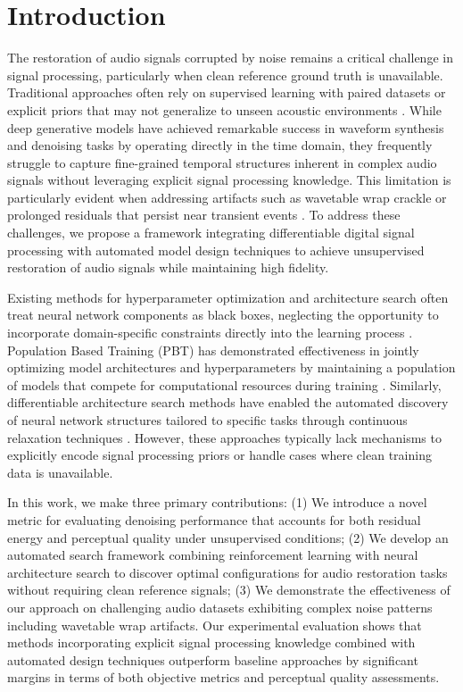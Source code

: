 \section{Introduction}

The restoration of audio signals corrupted by noise remains a critical challenge in signal processing, particularly when clean reference ground truth is unavailable. Traditional approaches often rely on supervised learning with paired datasets or explicit priors that may not generalize to unseen acoustic environments \cite{lehtinen2018n2n}. While deep generative models have achieved remarkable success in waveform synthesis and denoising tasks by operating directly in the time domain, they frequently struggle to capture fine-grained temporal structures inherent in complex audio signals without leveraging explicit signal processing knowledge. This limitation is particularly evident when addressing artifacts such as wavetable wrap crackle or prolonged residuals that persist near transient events \cite{engel2020ddsp}. To address these challenges, we propose a framework integrating differentiable digital signal processing with automated model design techniques to achieve unsupervised restoration of audio signals while maintaining high fidelity.

Existing methods for hyperparameter optimization and architecture search often treat neural network components as black boxes, neglecting the opportunity to incorporate domain-specific constraints directly into the learning process \cite{elsken2019nas}. Population Based Training (PBT) has demonstrated effectiveness in jointly optimizing model architectures and hyperparameters by maintaining a population of models that compete for computational resources during training \cite{jaderberg2017pbt}. Similarly, differentiable architecture search methods have enabled the automated discovery of neural network structures tailored to specific tasks through continuous relaxation techniques \cite{liu2019darts}. However, these approaches typically lack mechanisms to explicitly encode signal processing priors or handle cases where clean training data is unavailable.

In this work, we make three primary contributions: (1) We introduce a novel metric for evaluating denoising performance that accounts for both residual energy and perceptual quality under unsupervised conditions; (2) We develop an automated search framework combining reinforcement learning with neural architecture search to discover optimal configurations for audio restoration tasks without requiring clean reference signals; (3) We demonstrate the effectiveness of our approach on challenging audio datasets exhibiting complex noise patterns including wavetable wrap artifacts. Our experimental evaluation shows that methods incorporating explicit signal processing knowledge combined with automated design techniques outperform baseline approaches by significant margins in terms of both objective metrics and perceptual quality assessments.

